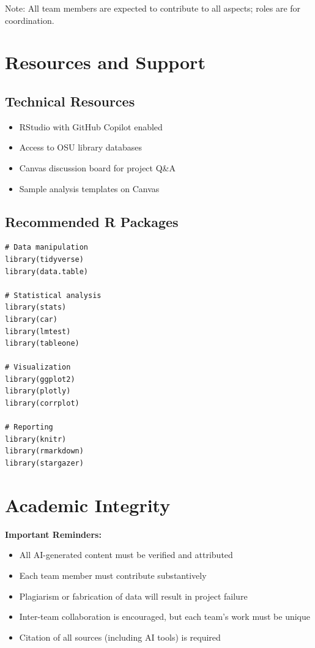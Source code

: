 \documentclass[11pt]{article}
\begin{document}
Note: All team members are expected to contribute to all aspects; roles are for coordination.

\section{Resources and Support}

\subsection{Technical Resources}
\begin{itemize}
\item RStudio with GitHub Copilot enabled
\item Access to OSU library databases
\item Canvas discussion board for project Q\&A
\item Sample analysis templates on Canvas
\end{itemize}

\subsection{Recommended R Packages}
\begin{verbatim}
# Data manipulation
library(tidyverse)
library(data.table)

# Statistical analysis
library(stats)
library(car)
library(lmtest)
library(tableone)

# Visualization
library(ggplot2)
library(plotly)
library(corrplot)

# Reporting
library(knitr)
library(rmarkdown)
library(stargazer)
\end{verbatim}

\section{Academic Integrity}

\begin{tcolorbox}[colback=red!5,colframe=red,boxrule=1pt,arc=2pt,left=6pt,right=6pt,top=6pt,bottom=6pt]
\textbf{Important Reminders:}
\begin{itemize}
\item All AI-generated content must be verified and attributed
\item Each team member must contribute substantively
\item Plagiarism or fabrication of data will result in project failure
\item Inter-team collaboration is encouraged, but each team's work must be unique
\item Citation of all sources (including AI tools) is required
\end{itemize}
\end{tcolorbox}
\end{document}
